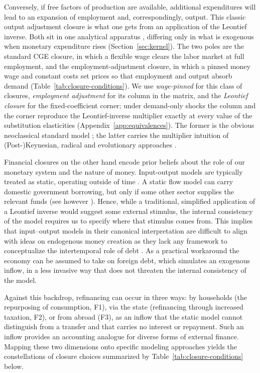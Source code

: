 Conversely, if free factors of production are available, additional expenditures will lead to an expansion of employment and, correspondingly, output. This classic output adjustment closure \citep{Taylor1990} is what one gets from an application of the Leontief inverse. Both sit in one analytical apparatus \citep{Robinson.2006}, differing only in what is exogenous when monetary expenditure rises (Section~\ref{sec:kernel}). The two poles are the standard CGE closure, in which a flexible wage clears the labor market at full employment, and the employment-adjustment closure, in which a pinned money wage and constant costs set prices so that employment and output absorb demand (Table~\ref{tab:closure-conditions}). We use \emph{wage-pinned} for this class of closures, \emph{employment adjustment} for its column in the matrix, and the \emph{Leontief closure} for the fixed-coefficient corner; under demand-only shocks the column and the corner reproduce the Leontief-inverse multiplier exactly at every value of the substitution elasticities (Appendix~\ref{app:equivalences}). The former is the obvious neoclassical standard model \citep[see][]{Sen1963, TaylorLysy1979}; the latter carries the multiplier intuition of (Post-)Keynesian, radical and evolutionary approaches \citep{Pollin.2015,Mazzucato.2018}. 

Financial closures on the other hand encode prior beliefs about the role of our monetary system and the nature of money. Input-output models are typically treated as static, operating outside of time \citep[see however][]{Mercure.2018,Rocchi.2025,McGregor.1996}. A static flow model can carry domestic government borrowing, but only if some other sector supplies the relevant funds (see however \citealp{Duchin.1998}). Hence, while a traditional, simplified application of a Leontief inverse would suggest some external stimulus, the internal consistency of the model requires us to specify where that stimulus comes from. This implies that input--output models in their canonical interpretation are difficult to align with ideas on endogenous money creation as they lack any framework to conceptualize the intertemporal role of debt \citep{Lavoie.2022}. As a practical workaround the economy can be assumed to take on foreign debt, which simulates an exogenous inflow, in a less invasive way that does not threaten the internal consistency of the model.

Against this backdrop, refinancing can occur in three ways: by households (the repurposing of consumption, F1), via the state (refinancing through increased taxation, F2), or from abroad (F3), as an inflow that the static model cannot distinguish from a transfer and that carries no interest or repayment. Such an inflow provides an accounting analogue for diverse forms of external finance. Mapping these two dimensions onto specific modeling approaches yields the constellations of closure choices summarized by Table~\ref{tab:closure-conditions} below.


